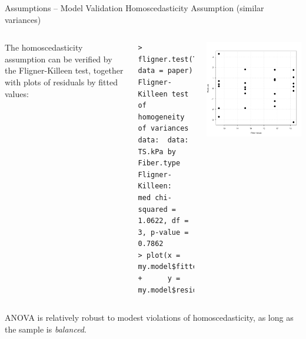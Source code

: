 %
\begin{frame}[fragile]
{Assumptions -- Model Validation}
{Homoscedasticity Assumption (similar variances)}
\begin{columns}
  The homoscedasticity assumption can be verified by the Fligner-Killeen test, together with plots of residuals by fitted values:

  {\smaller
\begin{verbatim}
> fligner.test(TS_kPa~Hardwood, data = paper)
Fligner-Killeen test of homogeneity of variances
data:  data:  TS.kPa by Fiber.type
Fligner-Killeen:
med chi-squared = 1.0622, df = 3, p-value = 0.7862
> plot(x = my.model$fitted.values,
+      y = my.model$residuals)
\end{verbatim}}

  \includegraphics[width=.9\textwidth]{../img/papervar.png}
\end{columns}
ANOVA is relatively robust to modest violations of homoscedasticity, as long as the sample is \textit{balanced}.

\end{frame}
%
%
